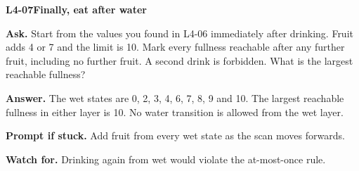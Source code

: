 \documentclass[11pt,a4paper]{article}
\begin{document}
\noindent\begin{minipage}{\textwidth}
{\color{teal}\textbf{L4-07}}\quad \textbf{Finally, eat after water}\par\smallskip
\textbf{Ask.} Start from the values you found in L4-06 immediately after drinking. Fruit adds 4 or 7 and the limit is 10. Mark every fullness reachable after any further fruit, including no further fruit. A second drink is forbidden. What is the largest reachable fullness?\par\smallskip
\textbf{Answer.} The wet states are 0, 2, 3, 4, 6, 7, 8, 9 and 10. The largest reachable fullness in either layer is 10. No water transition is allowed from the wet layer.\par\smallskip
\textbf{Prompt if stuck.} Add fruit from every wet state as the scan moves forwards.\par\smallskip
\textbf{Watch for.} Drinking again from wet would violate the at-most-once rule.
\end{minipage}\par{}\medskip
\end{document}
